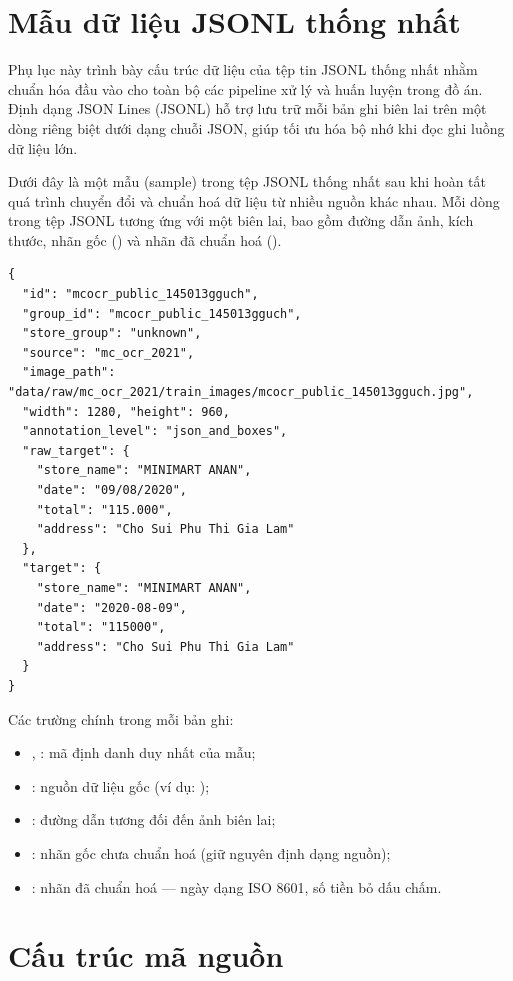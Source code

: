 \appendix

\section{Mẫu dữ liệu JSONL thống nhất}
\label{appendix:jsonl}

Phụ lục này trình bày cấu trúc dữ liệu của tệp tin JSONL thống nhất nhằm chuẩn hóa đầu vào cho toàn bộ các pipeline xử lý và huấn luyện trong đồ án. Định dạng JSON Lines (JSONL) hỗ trợ lưu trữ mỗi bản ghi biên lai trên một dòng riêng biệt dưới dạng chuỗi JSON, giúp tối ưu hóa bộ nhớ khi đọc ghi luồng dữ liệu lớn.

Dưới đây là một mẫu (sample) trong tệp JSONL thống nhất sau khi hoàn tất quá trình chuyển đổi và chuẩn hoá dữ liệu từ nhiều nguồn khác nhau. Mỗi dòng trong tệp JSONL tương ứng với một biên lai, bao gồm đường dẫn ảnh, kích thước, nhãn gốc () và nhãn đã chuẩn hoá ().

\begin{lstlisting}[style=json, caption={Một mẫu JSONL thống nhất}, label={lst:jsonl-sample}]
{
  "id": "mcocr_public_145013gguch",
  "group_id": "mcocr_public_145013gguch",
  "store_group": "unknown",
  "source": "mc_ocr_2021",
  "image_path": "data/raw/mc_ocr_2021/train_images/mcocr_public_145013gguch.jpg",
  "width": 1280, "height": 960,
  "annotation_level": "json_and_boxes",
  "raw_target": {
    "store_name": "MINIMART ANAN",
    "date": "09/08/2020",
    "total": "115.000",
    "address": "Cho Sui Phu Thi Gia Lam"
  },
  "target": {
    "store_name": "MINIMART ANAN",
    "date": "2020-08-09",
    "total": "115000",
    "address": "Cho Sui Phu Thi Gia Lam"
  }
}
\end{lstlisting}

Các trường chính trong mỗi bản ghi:
\begin{itemize}
  \item {}, : mã định danh duy nhất của mẫu;
  \item {}: nguồn dữ liệu gốc (ví dụ: );
  \item {}: đường dẫn tương đối đến ảnh biên lai;
  \item {}: nhãn gốc chưa chuẩn hoá (giữ nguyên định dạng nguồn);
  \item {}: nhãn đã chuẩn hoá — ngày dạng ISO 8601, số tiền bỏ dấu chấm.
\end{itemize}


\newpage
\section{Cấu trúc mã nguồn}
\label{appendix:source-code}

